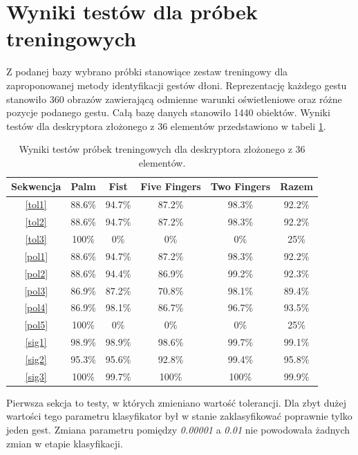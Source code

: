 \section{Wyniki testów dla próbek treningowych}
Z podanej bazy wybrano próbki stanowiące zestaw treningowy dla zaproponowanej metody identyfikacji gestów dłoni. Reprezentację każdego gestu stanowiło 360 obrazów zawierającą odmienne warunki oświetleniowe oraz różne pozycje podanego gestu. Całą bazę danych stanowiło 1440 obiektów. Wyniki testów dla deskryptora złożonego z 36 elementów przedstawiono w tabeli \ref{tab: train36}.

\begin{table} [h!]
	\centering
	\begin{tabular}{|c|c|c|c|c|c|}
		\hline
		\textbf{Sekwencja} 	& \textbf{Palm} & \textbf{Fist} & \textbf{Five Fingers} & \textbf{Two Fingers} & \textbf{Razem} \\ \hline
		\ref{tol1} 	& 88.6\% 		& 94.7\%		& 87.2\%	& 98.3\% 	& 92.2\% \\ \hline
		\ref{tol2} 	& 88.6\% 		& 94.7\%		& 87.2\%	& 98.3\% 	& 92.2\% \\ \hline
		\ref{tol3}	& 100\%			& 0\%			& 0\%		& 0\% 		& 25\% \\ \hline \hline
		\ref{pol1} 	& 88.6\% 		& 94.7\%		& 87.2\%	& 98.3\% 	& 92.2\% \\ \hline
		\ref{pol2} 	& 88.6\% 		& 94.4\%		& 86.9\%	& 99.2\% 	& 92.3\% \\ \hline
		\ref{pol3}	& 86.9\%		& 87.2\%		& 70.8\%	& 98.1\% 	& 89.4\% \\ \hline
		\ref{pol4}	& 86.9\%		& 98.1\%		& 86.7\%	& 96.7\% 	& 93.5\% \\ \hline
		\ref{pol5}	& 100\%			& 0\%			& 0\%		& 0\% 		& 25\% \\ \hline \hline
		\ref{sig1}	& 98.9\% 		& 98.9\%		& 98.6\%	& 99.7\% 	& 99.1\% \\ \hline
		\ref{sig2}	& 95.3\% 		& 95.6\%		& 92.8\%	& 99.4\% 	& 95.8\% \\ \hline
		\ref{sig3}	& 100\%			& 99.7\%		& 100\%		& 100\% 	& 99.9\% \\ \hline
	\end{tabular}
	\caption{Wyniki testów próbek treningowych dla deskryptora złożonego z 36 elementów.}
	\label{tab: train36}
\end{table}

Pierwsza sekcja to testy, w których zmieniano wartość tolerancji. Dla zbyt dużej wartości tego parametru klasyfikator był w stanie zaklasyfikować poprawnie tylko jeden gest. Zmiana parametru pomiędzy \textit{0.00001} a \textit{0.01} nie powodowała żadnych zmian w etapie klasyfikacji.    

